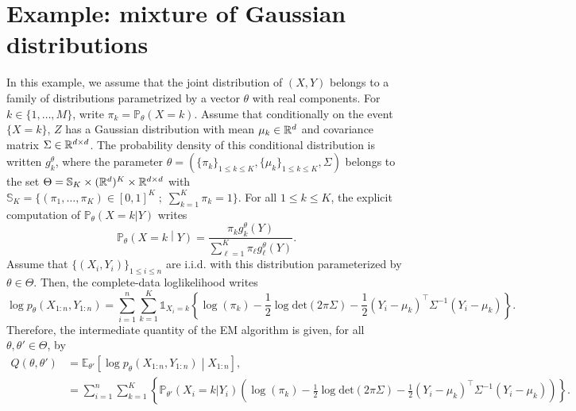 \documentclass[english,graybox,envcountchap,envcountsame,sectrefs,shortlabels]{svmono}
\theoremstyle{style}
\newcommand{\eqsp}{}
\begin{document}
\section{Example: mixture of Gaussian distributions}
In this example, we assume that the joint distribution of $(X,Y)$ belongs to a family of distributions parametrized by a vector $\theta$ with real components. For $k\in\{1,\ldots,M\}$, write $\pi_k = \mathbb{P}_\theta(X = k)$. Assume that conditionally on the event $\{X = k\}$, $Z$ has a Gaussian distribution with mean $\mu_k \in\mathbb{R}^d$ and covariance matrix $\Sigma\in \mathbb{R}^{d\times d}$. The probability density of this conditional distribution is written $g_k^\theta$, where the parameter $\theta=(\{\pi_k\}_{1\leq k \leq K}, \{\mu_k\}_{1\leq k \leq K}, \Sigma)$ belongs to the set $\Theta= \mathbb{S}_K \times (\mathbb{R}^d)^K  \times \mathbb{R}^{d \times d}$ with $\mathbb{S}_K = \{(\pi_1,\ldots,\pi_K)\in[0,1]^K\;;\; \sum_{k=1}^K \pi_k=1\}$. For all $1\leq k \leq K$, the explicit computation of $\mathbb{P}_\theta(X=k | Y)$ writes
$$
\mathbb{P}_\theta\left(X=k\middle | Y\right) = \frac{\pi_kg^{\theta}_k(Y)}{\sum_{\ell=1}^{K}\pi_\ell g^{\theta}_\ell(Y)}\eqsp. %
$$
Assume that $\{(X_i,Y_i)\}_{1\leq i\leq n}$ are i.i.d. with this distribution parameterized by $\theta\in\Theta$. Then, the complete-data loglikelihood writes
$$
\log p_\theta (X_{1:n},Y_{1:n}) = \sum_{i=1}^n \sum_{k=1}^K \mathds{1}_{X_i = k}\left\{\log(\pi_k) -\frac{1}{2}\log \mathrm{det}(2\pi \Sigma) -\frac{1}{2}(Y_i - \mu_{k})^\top \Sigma^{-1}(Y_i - \mu_{k})  \right\}\eqsp.%
$$
Therefore, the intermediate quantity of the EM algorithm is given, for all $\theta,\theta' \in\Theta$, by
\begin{align*}
Q(\theta,\theta') &= \mathbb{E}_{\theta'} \left[\log p_\theta (X_{1:n},Y_{1:n}) \middle | X_{1:n}\right]\eqsp,\\
&= \sum_{i=1}^n \sum_{k=1}^K \left\{ \mathbb{P}_{\theta'}(X_i = k|Y_i)\left( \log(\pi_k) -\frac{1}{2}\log \mathrm{det}(2\pi \Sigma)  -\frac{1}{2}(Y_i - \mu_{k})^\top \Sigma^{-1}(Y_i - \mu_{k})\right) \right\} \eqsp.%
\end{align*}
\end{document}
